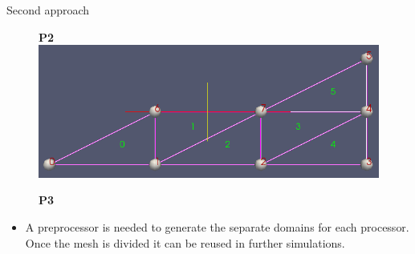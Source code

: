 \documentclass[t,english]{beamer}
\begin{document}
\begin{frame}{Second approach}
\begin{figure}[!htb]
\textbf{P2}
\endminipage\hfill
\centering
{}
\centering
\includegraphics[scale=0.15]{./p3.png}

\textbf{P3}
\endminipage\hfill
\end{figure}
\begin{itemize}
\item A preprocessor is needed to generate the separate domains for each processor. Once the mesh is divided it can be reused in further simulations.
\end{itemize}
\end{frame}
\end{document}
